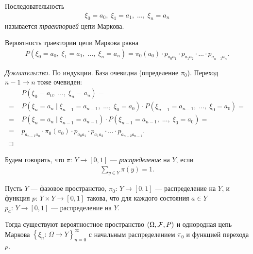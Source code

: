 \documentclass[../main.tex]{subfiles}
\begin{document}
\begin{df}
 Последовательность
 \begin{align*}
  \xi_0 = a_0,\; \xi_1 = a_1,\; \ldots,\; \xi_n = a_n
 \end{align*}
 называется \textit{траекторией} цепи Маркова.
\end{df}

\begin{thm}
 Вероятность траектории цепи Маркова равна
 \begin{align*}
  P(\xi_0 = a_0,\; \xi_1 = a_1,\; \ldots,\; \xi_n = a_n) = \pi_0(a_0) \cdot  p_{a_0 a_1} \cdot p_{a_1 a_2} \cdot  \ldots \cdot p_{a_{n-1}a_n}.
 \end{align*}
 \begin{proof}[\normalfont\textsc{Доказательство}]
  По индукции. База очевидна (определение $ \pi_0 $). Переход $ n-1 \to n $ тоже очевиден:
  \begin{align*}
   &P(\xi_0 = a_0,\; \ldots,\; \xi_n = a_n) =\\
   =\;&P(\xi_n = a_n \mid \xi_{n-1} = a_{n-1},\;\ldots,\;\xi_0 = a_0)\cdot P(\xi_{n-1} = a_{n-1},\;\ldots,\;\xi_0=a_0) = \\
   =\;&P(\xi_n = a_n \mid \xi_{n-1} = a_{n-1}) \cdot P(\xi_{n-1} = a_{n-1},\; \ldots,\; \xi_0 = a_0) = \\
   =\;&p_{a_{n-1} a_n} \cdot \pi_0(a_0) \cdot p_{a_0 a_1} \cdot p_{a_1 a_2} \cdot \ldots \cdot p_{a_{n-2} a_{n-1}}.
  \end{align*}
 \end{proof}
\end{thm}

\begin{df}
 Будем говорить, что $ \pi \colon\, Y \to [0,1] $ --- \textit{распределение} на $ Y $, если
 \begin{align*}
  \sum_{y \in Y} \pi(y) = 1.
 \end{align*}
\end{df}

\begin{thm}
 \label{theorem:markov_chain_exists}
 Пусть $ Y $ --- фазовое пространство, $ \pi_0 \colon\, Y \to [0,1] $ --- распределение на $ Y $, и функция $ p \colon\, Y \times Y \to [0,1] $ такова, что для каждого состояния $ a \in Y $ $ p_a \colon\, Y\to[0,1] $ --- распределение на $ Y $.

 Тогда существуют вероятностное пространство $ (\Omega,\mathcal F,P) $ и однородная цепь Маркова $ \left\{\xi_n\colon\,\Omega\to Y \right\}_{n=0}^{\infty} $ с начальным распределением $ \pi_0 $ и функцией перехода $ p $.
\end{thm}
\end{document}
